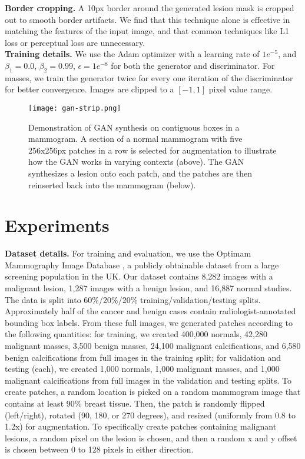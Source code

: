 \documentclass{article}
\begin{document}
\noindent\textbf{Border cropping.}
A 10px border around the generated lesion mask is cropped out to smooth border artifacts. We find that this technique alone is effective in matching the features of the input image, and that common techniques like L1 loss or perceptual loss are unnecessary. \\

\noindent\textbf{Training details.}
We use the Adam \cite{adam} optimizer with a learning rate of $1e^{-5}$, and $\beta_{1}=0.0$, $\beta_{2}=0.99$, $\epsilon = 1e^{-8}$ for both the generator and discriminator. For masses, we train the generator twice for every one iteration of the discriminator for better convergence. Images are clipped to a $[-1, 1]$ pixel value range. 

\begin{figure}[t]
\centering
\texttt{[image: gan-strip.png]}
\caption{Demonstration of GAN synthesis on contiguous boxes in a mammogram. A section of a normal mammogram with five 256x256px patches in a row is selected for augmentation to illustrate how the GAN works in varying contexts (above). The GAN synthesizes a lesion onto each patch, and the patches are then reinserted back into the mammogram (below). } \label{strips}
\end{figure}


\section{Experiments}
\noindent\textbf{Dataset details.}
For training and evaluation, we use the Optimam Mammography Image Database \cite{optimam}, a publicly obtainable dataset from a large screening population in the UK. Our dataset contains 8,282 images with a malignant lesion, 1,287 images with a benign lesion, and 16,887 normal studies. The data is split into 60\%/20\%/20\% training/validation/testing splits. Approximately half of the cancer and benign cases contain radiologist-annotated bounding box labels. From these full images, we generated patches according to the following quantities: for training, we created 400,000 normals, 42,280 malignant masses, 3,500 benign masses, 24,100 malignant calcifications, and 6,580 benign calcifications from full images in the training split; for validation and testing (each), we created 1,000 normals, 1,000 malignant masses, and 1,000 malignant calcifications from full images in the validation and testing splits. To create patches, a random location is picked on a random mammogram image that contains at least 90\% breast tissue. Then, the patch is randomly flipped (left/right), rotated (90, 180, or 270 degrees), and resized (uniformly from 0.8 to 1.2x) for augmentation. To specifically create patches containing malignant lesions, a random pixel on the lesion is chosen, and then a random x and y offset is chosen between 0 to 128 pixels in either direction.
\\ 
\end{document}
